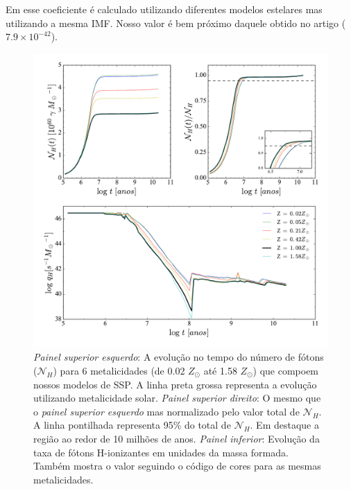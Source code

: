 Em \citet{Kennicutt.1998a} esse coeficiente é calculado utilizando diferentes modelos estelares mas
utilizando a mesma IMF. Nosso valor é bem próximo daquele obtido no artigo ($7.9 \times 10^{-42}$). 

\begin{figure}
	\centering
	\includegraphics[scale=0.62]{figuras/Nh_logt_metBase_Padova2000_salp.pdf}
	\caption[Evolução temporal do número e da taxa de fótons H-ionizantes em unidades da massa
	formada.] 
	{\emph{Painel superior esquerdo}: A	evolução no tempo do número de fótons ($\mathcal{N}_H$) para 6
metalicidades (de 0.02 $Z_\odot$ até 1.58 $Z_\odot$) que compoem nossos modelos de SSP. A linha
preta grossa representa a evolução utilizando metalicidade solar. \emph{Painel superior direito}:
O mesmo que o \emph{painel superior esquerdo} mas normalizado pelo valor total de $\mathcal{N}_H$.
A linha pontilhada representa 95\% do total de $\mathcal{N}_H$. Em destaque a região ao redor de 10
milhões de anos. \emph{Painel inferior}: Evolução da taxa de fótons H-ionizantes em unidades da
massa formada.
Também mostra o valor seguindo o código de cores para as mesmas metalicidades.}
	\label{fig:Nh_qh}
\end{figure}
 
